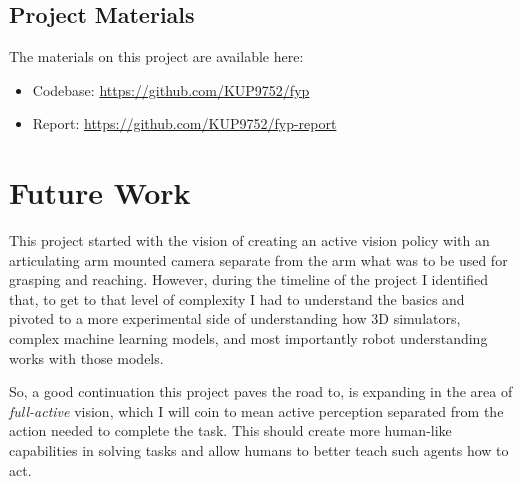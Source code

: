   \subsection{Project Materials}\label{subsec:conc-materials}
  The materials on this project are available here:
  \begin{itemize}
    \item Codebase: \url{https://github.com/KUP9752/fyp}
    \item Report: \url{https://github.com/KUP9752/fyp-report}
  \end{itemize}

\section{Future Work}
This project started with the vision of creating an active vision policy with an articulating arm mounted camera separate from the arm what was to be used for grasping and reaching. However, during the timeline of the project I identified that, to get to that level of complexity I had to understand the basics and pivoted to a more experimental side of understanding how 3D simulators, complex machine learning models, and most importantly robot understanding works with those models.

So, a good continuation this project paves the road to, is expanding in the area of \emph{full-active} vision, which I will coin to mean active perception separated from the action needed to complete the task. This should create more human-like capabilities in solving tasks and allow humans to better teach such agents how to act.